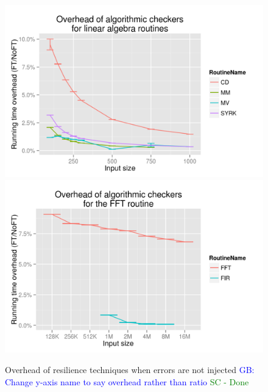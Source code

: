\documentclass{sig-alternate}
\newcommand{\sui}[1]{%
  \textcolor{green}{SC - #1}
}
\newcommand{\greg}[1]{%
  \textcolor{blue}{GB: #1}
}
\begin{document}
\begin{figure}[ht!]
\centering
\includegraphics[width=1.00\columnwidth]{figs/4_1_1_Exp1_linalg}
\includegraphics[width=1.00\columnwidth]{figs/4_1_1_Exp1_fft}
\caption{Overhead of resilience techniques when errors are not injected \greg{Change y-axis name to say overhead rather than ratio} \sui{Done}}
\label{fig:routine_detect_ovhd}
\end{figure}
\end{document}

